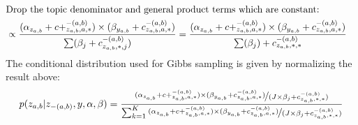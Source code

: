 \documentclass{article}%
\theoremstyle{definition}
\begin{document}
\begin{align}
    \intertext{Drop the topic denominator and general product terms which are constant:}
        &\propto \frac{(\alpha_{z_{a,b}}+ c+_{z_{a,b},a,*}^{-(a,b)})\times(\beta_{y_{a,b}}+c_{z_{a,b},a,*}^{-(a,b)})}{\sum(\beta_j + c_{z_{a,b},*,j}^{-(a,b)})} = \frac{(\alpha_{z_{a,b}}+ c+_{z_{a,b},a,*}^{-(a,b)})\times(\beta_{y_{a,b}}+c_{z_{a,b},a,*}^{-(a,b)})}{\sum(\beta_j) + c_{z_{a,b},*,*}^{-(a,b)}}
\end{align}
The conditional distribution used for Gibbs sampling is given by normalizing the result above:
\begin{equation}
p(z_{a,b}|z_{-(a,b)},y,\alpha,\beta) = \frac{\nicefrac{(\alpha_{z_{a,b}}+ c+_{z_{a,b},a,*}^{-(a,b)})\times(\beta_{y_{a,b}}+c_{z_{a,b},a,*}^{-(a,b)})}{(J \times \beta_j + c_{z_{a,b},*,*}^{-(a,b)})}}{\sum_{k=1}^{K}\nicefrac{(\alpha_{z_{a,b}}+ c+_{z_{a,b},a,*}^{-(a,b)})\times(\beta_{y_{a,b}}+c_{z_{a,b},a,*}^{-(a,b)})}{(J \times \beta_j + c_{z_{a,b},*,*}^{-(a,b)})}}
\end{equation}
\end{document}
